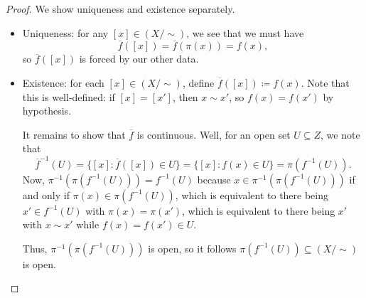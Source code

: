 \documentclass[../notes.tex]{subfiles}
\begin{document}
\begin{proof}
	We show uniqueness and existence separately.
	\begin{itemize}
		\item Uniqueness: for any $[x]\in(X/{\sim})$, we see that we must have
		\[\overline f([x])=\overline f(\pi(x))=f(x),\]
		so $\overline f([x])$ is forced by our other data.
		\item Existence: for each $[x]\in(X/{\sim})$, define $\overline f([x])\coloneqq f(x)$. Note that this is well-defined: if $[x]=[x']$, then $x\sim x'$, so $f(x)=f(x')$ by hypothesis.

		It remains to show that $\overline f$ is continuous. Well, for an open set $U\subseteq Z$, we note that
		\[\overline f^{-1}(U)=\{[x]:\overline f([x])\in U\}=\{[x]:f(x)\in U\}=\pi\left(f^{-1}(U)\right).\]
		Now, $\pi^{-1}\left(\pi\left(f^{-1}(U)\right)\right)=f^{-1}(U)$ because $x\in\pi^{-1}\left(\pi\left(f^{-1}(U)\right)\right)$ if and only if $\pi(x)\in\pi\left(f^{-1}(U)\right)$, which is equivalent to there being $x'\in f^{-1}(U)$ with $\pi(x)=\pi(x')$, which is equivalent to there being $x'$ with $x\sim x'$ while $f(x)=f(x')\in U$.
		
		Thus, $\pi^{-1}\left(\pi\left(f^{-1}(U)\right)\right)$ is open, so it follows $\pi\left(f^{-1}(U)\right)\subseteq(X/{\sim})$ is open.
		\qedhere
	\end{itemize}
\end{proof}
\end{document}

